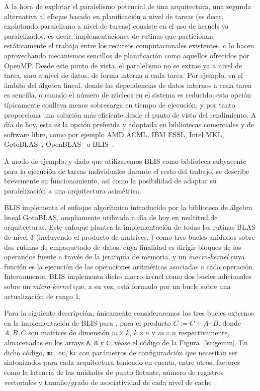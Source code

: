 A la hora de explotar el paralelismo potencial de una arquitectura, una segunda alternativa al efoque 
basado en planificación a nivel de tareas (es decir, explotando paralelismo
a nivel de tareas) consiste en el uso de kernels ya paralelizados, es decir, implementaciones
de rutinas que particionan estáticamente el trabajo entre los recursos computacionales existentes, o 
lo hacen aprovechando mecanismos sencillos de planificación como aquellos ofrecidos por OpenMP. Desde
este punto de vista, el paralelismo no se extrae ya a nivel de tarea, sino a nivel de datos, de forma
interna a cada tarea. Por ejemplo, en el ámbito del álgebra lineal, donde las dependencias de datos
internos a cada tarea es sencilla, o cuando el número de núcleos en el sistema es reducido, esta 
opción típicamente conlleva menos sobrecarga en tiempo de ejecución, y por tanto proporciona
una solución más eficiente desde el punto de vista del rendimiento. A día de hoy, esta es la
opción preferida y adoptada en bibliotecas comerciales y de software libre, como por ejemplo
AMD ACML, IBM ESSL, Intel MKL, GotoBLAS~\cite{Goto:2008:AHP}, OpenBLAS~\cite{OpenBLAS} o BLIS~\cite{BLIS}.

A modo de ejemplo, y dado que utilizaremos BLIS como biblioteca subyacente para la ejecución de tareas
individuales durante el resto del trabajo, se describe brevemente su funcionamiento, así como la posibilidad
de adaptar su paralelización a una arquitectura asimétrica.

BLIS implementa el enfoque algorítmico introducido por la biblioteca de álgebra lineal GotoBLAS, ampliamente
utilizada a día de hoy en multitud de arquitecturas. Este enfoque plantea la implementación de todas las rutinas
BLAS de nivel 3 (incluyendo el producto de matrices, \gemm) como tres bucles anidados sobre dos rutinas de 
empaquetado de datos, cuya finalidad es dirigir bloques de los operandos fuente a través de la jerarquía
de memoria, y un {\em macro-kernel} cuya función es la ejecución de las operaciones aritméticas asociadas
a cada operación. Internamente, BLIS implementa dicho macro-kernel como dos bucles adicionales sobre un 
{\em micro-kernel} que, a su vez, está formado por un bucle sobre una actualización de rango 1.

Para la siguiente descripción, únicamente consideraremos los tres bucles externos en la implementación de 
BLIS para \gemm, para el producto $C:=C+A\cdot B$, donde $A,B,C$ son matrices de dimensión $m \times k$, $k\times n$ 
y $m \times n$ respectivamente, almacenadas en los arrays {\tt A}, {\tt B} y {\tt C}; véase el código de la Figura~\ref{lst:gemm}.
En dicho código, {\tt mc}, {\tt nc}, {\tt kc} con parámetros de configuradción que necesitan ser sintonizados para cada
arquitectura teniendo en cuenta, entre otros, factores como la latencia de las unidades de punto flotante, número
de registros vectoriales y tamaño/grado de asociatividad de cada nivel de cache~\cite{BLIS4}.

